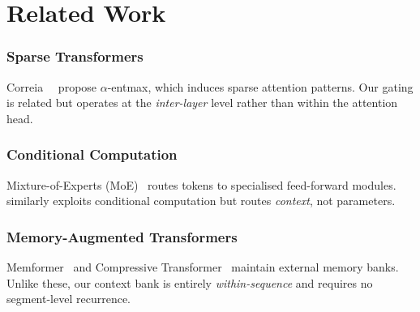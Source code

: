 \section{Related Work}
\label{sec:related}

\subsubsection{Sparse Transformers}
Correia~\etal~\cite{correia2019adaptively} propose $\alpha$-entmax, which
induces sparse attention patterns. Our gating is related but operates at the
\emph{inter-layer} level rather than within the attention head.

\subsubsection{Conditional Computation}
Mixture-of-Experts (MoE)~\cite{shazeer2017outrageously} routes tokens to
specialised feed-forward modules. \modelname{} similarly exploits conditional
computation but routes \emph{context}, not parameters.

\subsubsection{Memory-Augmented Transformers}
Memformer~\cite{wu2020memformer} and Compressive Transformer~\cite{rae2020compressive}
maintain external memory banks. Unlike these, our context bank is entirely
\emph{within-sequence} and requires no segment-level recurrence.

